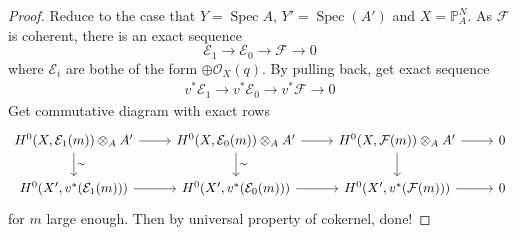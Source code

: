 \documentclass{ctexart}
\newcommand{\spec}{\operatorname{Spec}}
\begin{document}
\begin{proof}
    Reduce to the case that $Y = \spec A$, $Y' = \spec(A')$ and $X = \mathbb{P}_{A}^{N}$.
    As $\mathcal{F}$ is coherent, there is an exact sequence
    \begin{equation*}
        \mathcal{E}_{1} \longrightarrow \mathcal{E}_{0} \longrightarrow \mathcal{F} \longrightarrow 0
    \end{equation*}
    where $\mathcal{E}_{i}$ are bothe of the form $\oplus \mathcal{O}_{X}(q)$.
    By pulling back, get exact sequence
    \begin{eqnarray}
        v^{\ast}\mathcal{E}_{1} \longrightarrow v^{\ast}\mathcal{E}_{0} \longrightarrow v^{\ast}\mathcal{F} \longrightarrow 0
    \end{eqnarray}
    Get commutative diagram with exact rows
    \begin{equation*}
        \begin{tikzcd}
            H^{0}(X, \mathcal{E}_{1}(m)) \otimes_{A} A' \arrow[r] \arrow[d, "\sim"] &
            H^{0}(X, \mathcal{E}_{0}(m)) \otimes_{A} A' \arrow[r] \arrow[d, "\sim"] &
            H^{0}(X, \mathcal{F}(m)) \otimes_{A} A' \arrow[r] \arrow[d] &
            0 \\
            H^{0}(X', v^{\ast}(\mathcal{E}_{1}(m))) \arrow[r] &
            H^{0}(X', v^{\ast}(\mathcal{E}_{0}(m))) \arrow[r] &
            H^{0}(X', v^{\ast}(\mathcal{F}(m))) \arrow[r] &
            0
        \end{tikzcd}
    \end{equation*}
    for $m$ large enough.
    Then by universal property of cokernel, done!
\end{proof}
\end{document}
